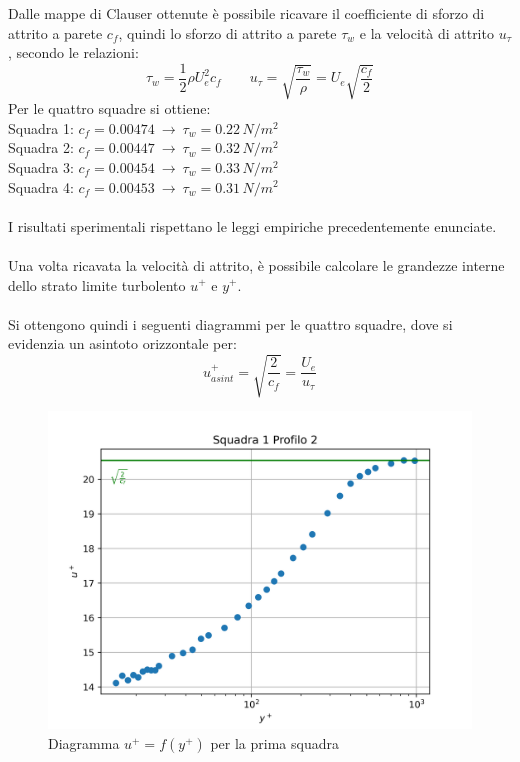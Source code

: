 \newpage
\noindent Dalle mappe di Clauser ottenute è possibile ricavare il coefficiente di sforzo di attrito a parete $c_f$, quindi lo sforzo di attrito a parete $\tau_w$ e la velocità di attrito $u_\tau$, secondo le relazioni:
\begin{equation*}
    \tau_ w = \frac12 \rho U_e^2 c_f \qquad u_\tau = \sqrt{\frac{\tau_w}\rho}=U_e\sqrt{\frac{c_f}2}
\end{equation*}
Per le quattro squadre si ottiene:\\
Squadra 1: $c_f = 0.00474\ \rightarrow\ \tau_w = 0.22\,N/m^2$\\
Squadra 2: $c_f = 0.00447\ \rightarrow\ \tau_w = 0.32\,N/m^2$\\
Squadra 3: $c_f = 0.00454\ \rightarrow\ \tau_w = 0.33\,N/m^2$\\
Squadra 4: $c_f = 0.00453\ \rightarrow\ \tau_w = 0.31\,N/m^2$\\\\
I risultati sperimentali rispettano le leggi empiriche precedentemente enunciate.\\\\
Una volta ricavata la velocità di attrito, è possibile calcolare le grandezze interne dello strato limite turbolento $u^+$ e $y^+$.\\\\
Si ottengono quindi i seguenti diagrammi per le quattro squadre, dove si evidenzia un asintoto orizzontale per:
\begin{equation*}
    u^+_{asint} = \sqrt{\frac{2}{c_f}} = \frac{U_e}{u_\tau}
\end{equation*}
\begin{figure}[H]
    \centering
    \includegraphics[width=.85\textwidth]{images/9/sq1p2+.png}
    \caption{Diagramma $u^+=f(y^+)$ per la prima squadra}
\end{figure}


